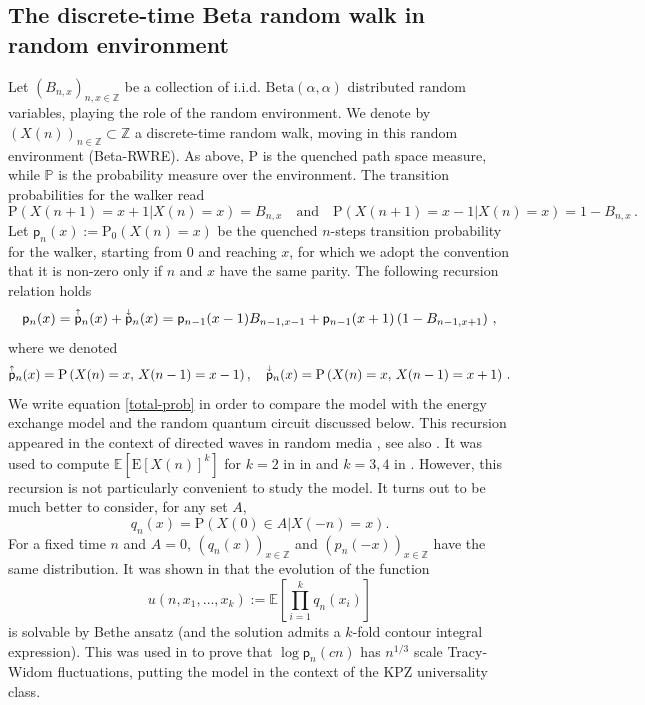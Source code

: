 \documentclass[a4paper,11pt,oneside,reqno]{amsart}
\theoremstyle{definition}
\numberwithin{equation}{section}
\begin{document}
\subsection{The discrete-time Beta random walk in random environment} \label{section-dt-RWRE}
Let $(B_{n,x})_{n,x\in\mathbb{Z}}$ be a collection of i.i.d. $\text{Beta}(\alpha,\alpha)$ distributed random variables, playing the role of the random environment. We denote by $(X(n))_{n\in \mathbb{Z}}\subset \mathbb{Z}$ a discrete-time random walk, moving in this random environment (Beta-RWRE). As above, $\mathrm{P}$ is the quenched path space measure, while $\mathbb{P}$ is the probability measure over the environment. The transition probabilities for the walker read 
\begin{equation*}
    \text{P}(X(n+1)=x+1|X(n)=x)=B_{n,x}\quad \text{and}\quad \text{P}(X(n+1)=x-1|X(n)=x)=1-B_{n,x}\,.
\end{equation*}
 Let $\mathsf{p}_n(x):=\mathrm P_0\left(X(n)=x\right)$ be the quenched $n$-steps transition probability for the walker, starting from $0$ and reaching $x$, for which we adopt the convention that it is non-zero only if $n$ and $x$ have the same parity. The following recursion relation holds
 	\begin{equation}\label{total-prob}
	\mathsf{p}_n(x)	=\accentset{\uparrow}{\mathsf{p}}_{n}(x)+\accentset{\downarrow}{\mathsf{p}}_{n}(x)=
		\mathsf{p}_{n-1}(x-1)B_{n-1,x-1}+\mathsf{p}_{n-1}(x+1)\left(1-B_{n-1,x+1}\right)\,,
	\end{equation}
    where we denoted
    \begin{equation*}
		\accentset{\uparrow}{\mathsf{p}}_{n}(x)=
		\text{P}\left(X(n)=x,\,X(n-1)=x-1\right),\quad 
		\accentset{\downarrow}{\mathsf{p}}_{n}(x)=	\text{P}\left(X(n)=x,\,X(n-1)=x+1\right)\,.
	\end{equation*}
We write equation \eqref{total-prob} in order to compare the model with the energy exchange model and the random quantum circuit discussed below.  This recursion appeared in the context of directed waves in random media \cite{kardar1992}, see also  \cite{PhysRevB.50.5119,kardar1994directed}. It was used  to compute $\mathbb{E}[\mathrm{E}[X(n)]^k]$ for $k=2$ in in \cite{kardar1992} and $k=3,4$ in  \cite{PhysRevB.50.5119}. 
However, this recursion is not particularly convenient to study the model. It turns out to be much better to consider, for any set $A$, 
$$q_n(x) = \mathrm{P}(X(0)\in A \vert X(-n)=x).$$
For a fixed time $n$ and $A={0}$, $(q_n(x))_{x\in \mathbb Z}$ and $(p_n(-x))_{x\in \mathbb Z}$ have the same distribution. It was shown in \cite{barraquand2015} that the evolution of the function 
$$ u(n,x_1, \dots, x_k) := \mathbb{E}\left[ \prod_{i=1}^k q_n(x_i) \right] $$
is solvable by Bethe ansatz (and the solution admits a $k$-fold contour integral expression). This was used in \cite{barraquand2015} to prove that $ \log \mathsf p_n(cn)$  has $n^{1/3}$ scale Tracy-Widom fluctuations, putting the model in the context of the  KPZ universality class.
\end{document}
